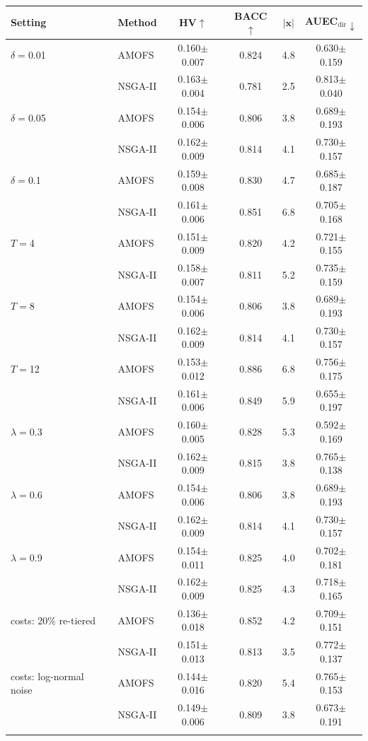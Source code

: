 \begin{tabular}{llcccc}
\toprule
Setting & Method & HV$\uparrow$ & BACC$\uparrow$ & $|\mathbf{x}|$ & AUEC$_{\mathrm{dir}}\downarrow$ \\
\midrule
$\delta=$0.01 & AMOFS & 0.160$\pm$0.007 & 0.824 & 4.8 & 0.630$\pm$0.159 \\
 & NSGA-II & 0.163$\pm$0.004 & 0.781 & 2.5 & 0.813$\pm$0.040 \\
\addlinespace[2pt]
$\delta=$0.05 & AMOFS & 0.154$\pm$0.006 & 0.806 & 3.8 & 0.689$\pm$0.193 \\
 & NSGA-II & 0.162$\pm$0.009 & 0.814 & 4.1 & 0.730$\pm$0.157 \\
\addlinespace[2pt]
$\delta=$0.1 & AMOFS & 0.159$\pm$0.008 & 0.830 & 4.7 & 0.685$\pm$0.187 \\
 & NSGA-II & 0.161$\pm$0.006 & 0.851 & 6.8 & 0.705$\pm$0.168 \\
\addlinespace[2pt]
$T=$4 & AMOFS & 0.151$\pm$0.009 & 0.820 & 4.2 & 0.721$\pm$0.155 \\
 & NSGA-II & 0.158$\pm$0.007 & 0.811 & 5.2 & 0.735$\pm$0.159 \\
\addlinespace[2pt]
$T=$8 & AMOFS & 0.154$\pm$0.006 & 0.806 & 3.8 & 0.689$\pm$0.193 \\
 & NSGA-II & 0.162$\pm$0.009 & 0.814 & 4.1 & 0.730$\pm$0.157 \\
\addlinespace[2pt]
$T=$12 & AMOFS & 0.153$\pm$0.012 & 0.886 & 6.8 & 0.756$\pm$0.175 \\
 & NSGA-II & 0.161$\pm$0.006 & 0.849 & 5.9 & 0.655$\pm$0.197 \\
\addlinespace[2pt]
$\lambda=$0.3 & AMOFS & 0.160$\pm$0.005 & 0.828 & 5.3 & 0.592$\pm$0.169 \\
 & NSGA-II & 0.162$\pm$0.009 & 0.815 & 3.8 & 0.765$\pm$0.138 \\
\addlinespace[2pt]
$\lambda=$0.6 & AMOFS & 0.154$\pm$0.006 & 0.806 & 3.8 & 0.689$\pm$0.193 \\
 & NSGA-II & 0.162$\pm$0.009 & 0.814 & 4.1 & 0.730$\pm$0.157 \\
\addlinespace[2pt]
$\lambda=$0.9 & AMOFS & 0.154$\pm$0.011 & 0.825 & 4.0 & 0.702$\pm$0.181 \\
 & NSGA-II & 0.162$\pm$0.009 & 0.825 & 4.3 & 0.718$\pm$0.165 \\
\addlinespace[2pt]
costs: 20\% re-tiered & AMOFS & 0.136$\pm$0.018 & 0.852 & 4.2 & 0.709$\pm$0.151 \\
 & NSGA-II & 0.151$\pm$0.013 & 0.813 & 3.5 & 0.772$\pm$0.137 \\
\addlinespace[2pt]
costs: log-normal noise & AMOFS & 0.144$\pm$0.016 & 0.820 & 5.4 & 0.765$\pm$0.153 \\
 & NSGA-II & 0.149$\pm$0.006 & 0.809 & 3.8 & 0.673$\pm$0.191 \\
\addlinespace[2pt]
\bottomrule
\end{tabular}
